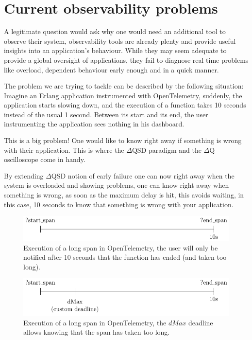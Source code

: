 \section{Current observability problems}

    A legitimate question would ask why one would need an additional tool to observe their system, observability tools are already plenty and provide useful insights into an application's behaviour. While they may seem adequate to provide a global oversight of applications, they fail to diagnose real time problems like overload, dependent behaviour early enough and in a quick manner.

    The problem we are trying to tackle can be described by the following situation: 
    Imagine an Erlang application instrumented with OpenTelemetry, suddenly, the application starts slowing down, and the execution of a function takes 10 seconds instead of the usual 1 second. Between its start and its end, the user instrumenting the application sees nothing in his dashboard.
    
    This is a big problem! One would like to know right away if something is wrong with their application. This is where the $\Delta$QSD paradigm and the $\Delta$Q oscilloscope come in handy.
   
   By extending $\Delta$QSD notion of early failure one can now right away when the system is overloaded and showing problems, one can know right away when something is wrong, as soon as the maximum delay is hit, this avoids waiting, in this case, 10 seconds to know that something is wrong with your application. \label{timeout}
    
    \begin{figure}[H]
        \begin{center}
            \includegraphics{tikz/start_end.pdf}
        \end{center}
        \caption{Execution of a long span in OpenTelemetry, the user will only be notified after 10 seconds that the function has ended (and taken too long).}
    \end{figure}

    \begin{figure}[H]
        \begin{center}
            \includegraphics{tikz/start_end_dmax.pdf}
        \end{center}
        \caption{Execution of a long span in OpenTelemetry, the $dMax$ deadline allows knowing that the span has taken too long.}
        \label{fig:otel_dmax}
    \end{figure} 


